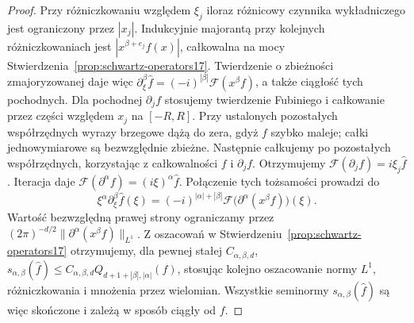 \begin{proof}
Przy różniczkowaniu względem $\xi_j$ iloraz różnicowy
czynnika wykładniczego jest ograniczony przez $|x_j|$.
Indukcyjnie majorantą przy kolejnych różniczkowaniach
jest $|x^{\beta+e_j}f(x)|$, całkowalna na mocy
Stwierdzenia~\ref{prop:schwartz-operators17}.
Twierdzenie o zbieżności zmajoryzowanej daje więc
$\partial_\xi^\beta\widehat f=(-i)^{|\beta|}
\mathcal F(x^\beta f)$, a także ciągłość tych pochodnych.
Dla pochodnej $\partial_j f$ stosujemy twierdzenie Fubiniego
i całkowanie przez części względem $x_j$ na $[-R,R]$.
Przy ustalonych pozostałych współrzędnych wyrazy brzegowe
dążą do zera, gdyż $f$ szybko maleje; całki jednowymiarowe
są bezwzględnie zbieżne. Następnie całkujemy po pozostałych
współrzędnych, korzystając z całkowalności $f$ i $\partial_j f$.
Otrzymujemy $\mathcal F(\partial_j f)=i\xi_j\widehat f$.
Iteracja daje $\mathcal F(\partial^\alpha f)=(i\xi)^\alpha\widehat f$.
Połączenie tych tożsamości prowadzi do
\[
\xi^\alpha\partial_\xi^\beta\widehat f(\xi)
=(-i)^{|\alpha|+|\beta|}
\mathcal F\bigl(\partial^\alpha(x^\beta f)\bigr)(\xi).
\]
Wartość bezwzględną prawej strony ograniczamy przez
$(2\pi)^{-d/2}\|\partial^\alpha(x^\beta f)\|_{L^1}$.
Z oszacowań w Stwierdzeniu~\ref{prop:schwartz-operators17}
otrzymujemy, dla pewnej stałej $C_{\alpha,\beta,d}$,
$s_{\alpha,\beta}(\widehat f)\le
C_{\alpha,\beta,d}Q_{d+1+|\beta|,|\alpha|}(f)$,
stosując kolejno oszacowanie normy $L^1$, różniczkowania
i mnożenia przez wielomian.
Wszystkie seminormy $s_{\alpha,\beta}(\widehat f)$ są więc
skończone i zależą w sposób ciągły od $f$.


\end{proof}
